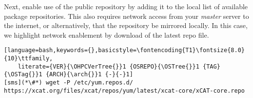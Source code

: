 Next, enable use of the public \xCAT{} repository by adding it to the local list
of available package repositories. This also requires network access from
your {\em master} server to the internet, or alternatively, that
the repository be mirrored locally. In this case, we highlight network
enablement by download of the
latest \xCAT{} repo file.

\begin{lstlisting}[language=bash,keywords={},basicstyle=\fontencoding{T1}\fontsize{8.0}{10}\ttfamily,
	literate={VER}{\OHPCVerTree{}}1 {OSREPO}{\OSTree{}}1 {TAG}{\OSTag{}}1 {ARCH}{\arch{}}1 {-}{-}1]
[sms](*\#*) wget -P /etc/yum.repos.d/ https://xcat.org/files/xcat/repos/yum/latest/xcat-core/xCAT-core.repo
\end{lstlisting}

